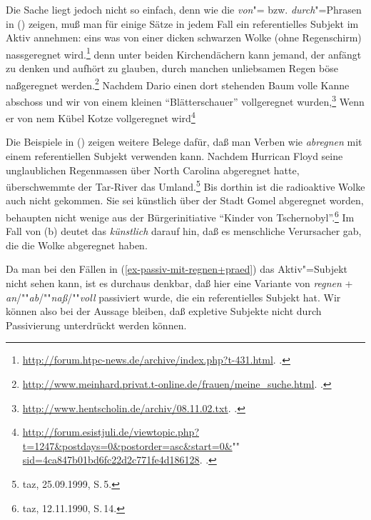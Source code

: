 Die Sache liegt jedoch nicht so einfach, denn wie die \emph{von}"= bzw. \emph{durch}"=Phrasen in () zeigen,
muß man für einige Sätze in jedem Fall ein referentielles Subjekt im Aktiv annehmen:
\eal
\label{bsp-regnen+resultativ-aktiv}
\ex eins was von einer dicken schwarzen Wolke (ohne Regenschirm) nassgeregnet wird.\footnote{
  \url{http://forum.htpc-news.de/archive/index.php?t-431.html}. .
}
\ex denn unter beiden Kirchendächern kann jemand, der anfängt zu denken und aufhört
zu glauben, durch manchen unliebsamen Regen böse naßgeregnet werden.\footnote{
  \url{http://www.meinhard.privat.t-online.de/frauen/meine_suche.html}. .
}
\ex Nachdem Dario einen dort stehenden Baum volle Kanne abschoss und wir von einem kleinen
"`Blätterschauer"' vollgeregnet wurden,\footnote{
\url{http://www.hentscholin.de/archiv/08.11.02.txt}. .
}
\ex Wenn er von nem Kübel Kotze vollgeregnet wird\footnote{%
\href{http://forum.esistjuli.de/viewtopic.php?t=1247&postdays=0&postorder=asc&start=0&sid=4ca847b01bd6fc22d2c771fe4d186128}{http://forum.esistjuli.de/viewtopic.php?t=1247\&postdays=0\&postorder=asc\&start=0\&}""%
\href{http://forum.esistjuli.de/viewtopic.php?t=1247&postdays=0&postorder=asc&start=0&sid=4ca847b01bd6fc22d2c771fe4d186128}{sid=4ca847b01bd6fc22d2c771fe4d186128}. .%
}
\zl

\noindent
Die Beispiele in () zeigen weitere Belege dafür, daß man Verben wie \emph{abregnen} mit einem referentiellen
Subjekt verwenden kann.
\eal
\ex Nachdem Hurrican Floyd seine unglaublichen Regenmassen über North Carolina abgeregnet hatte, überschwemmte der Tar-River das Umland.\footnote{
 taz, 25.09.1999, S.\,5.
}
\ex Bis dorthin ist die radioaktive Wolke auch nicht gekommen. 
    Sie sei künstlich über der Stadt Gomel abgeregnet worden, behaupten nicht wenige aus der Bürgerinitiative "`Kinder von Tschernobyl"'.\footnote{
taz, 12.11.1990, S.\,14.
}
\zl
Im Fall von (b) deutet das \emph{künstlich} darauf hin, daß es menschliche Verursacher gab, die
die Wolke abgeregnet haben.

Da man bei den Fällen in (\ref{ex-passiv-mit-regnen+praed}) das Aktiv"=Subjekt nicht sehen kann,
ist es durchaus denkbar, daß hier eine Variante von \emph{regnen} + \emph{an}/""\emph{ab}/""\emph{naß}/""\emph{voll}
passiviert wurde, die ein referentielles Subjekt hat.
Wir können also bei der Aussage bleiben, daß expletive Subjekte nicht durch Passivierung unterdrückt
werden können.


